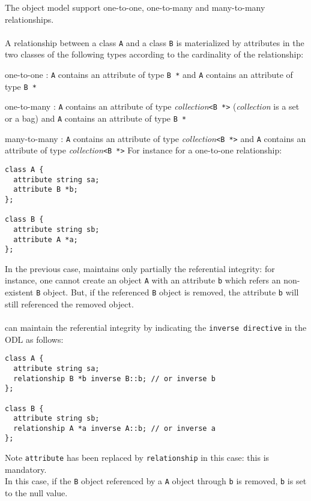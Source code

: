The \eyedb object model support one-to-one, one-to-many and many-to-many
relationships. 
\\
\\
A relationship between a class \texttt{A} and a class \texttt{B} is
materialized by attributes in the two classes of the following
types according to the cardinality of the relationship:
\bi
\item one-to-one : \texttt{A} contains an attribute of type \texttt{B *} and
\texttt{A} contains an attribute  of type \texttt{B *}
\item one-to-many : \texttt{A} contains an attribute of type \emph{collection}\texttt{<B *>} (\emph{collection} is a set or a bag) and
\texttt{A} contains an attribute  of type \texttt{B *}
\item many-to-many : \texttt{A} contains an attribute of type \emph{collection}\texttt{<B *>} and
\texttt{A} contains an attribute  of type \emph{collection}\texttt{<B *>}
\ei
For instance for a one-to-one relationship:
\vspace{-0.2cm}
\begin{verbatim}
class A {
  attribute string sa;
  attribute B *b;
};

class B {
  attribute string sb;
  attribute A *a;
};
\end{verbatim}
In the previous case, \eyedb maintains only partially the referential
integrity: for instance, one cannot create an object \texttt{A}
with an attribute \texttt{b} which refers an non-existent \texttt{B}
object. But, if the referenced \texttt{B} object is removed, the attribute
\texttt{b} will still referenced the removed object.
\\
\\
\eyedb can maintain the referential integrity by indicating the
\texttt{inverse directive} in the ODL as follows:
\vspace{-0.2cm}
\begin{verbatim}
class A {
  attribute string sa;
  relationship B *b inverse B::b; // or inverse b
};

class B {
  attribute string sb;
  relationship A *a inverse A::b; // or inverse a
};
\end{verbatim}
Note \texttt{attribute} has been replaced by \texttt{relationship} in
this case: this is mandatory.
\\
In this case, if the \texttt{B} object referenced by a \texttt{A} object
through \texttt{b} is removed, \texttt{b} is set to the null value.
\\
